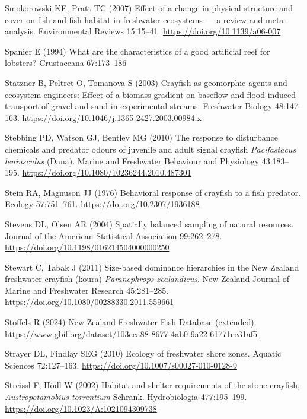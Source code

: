 \documentclass[
  12pt,
  a4paper,
  oneside]{scrbook}
\newlength{\cslhangindent}
\newenvironment{CSLReferences}[2] %
 {\begin{list}{}{%
  \setlength{\itemindent}{0pt}
  \setlength{\leftmargin}{0pt}
  \setlength{\parsep}{0pt}
  \ifodd #1
   \setlength{\leftmargin}{\cslhangindent}
   \setlength{\itemindent}{-1\cslhangindent}
  \fi
  \setlength{\itemsep}{#2\baselineskip}}}
 {\end{list}}
\renewenvironment{CSLReferences}[2]
   {\begin{list}{}{%
    \setlength{\itemindent}{0pt}
    \setlength{\leftmargin}{0pt}
    \setlength{\parsep}{0pt}
    \ifodd #1
     \setlength{\leftmargin}{\cslhangindent}
     \setlength{\itemindent}{-1\cslhangindent}
    \fi
    \setlength{\itemsep}{0.3\baselineskip}}}
   {\end{list}}%
\begin{document}
\begin{CSLReferences}{1}{1}
Smokorowski KE, Pratt TC (2007) Effect of a change in physical structure
and cover on fish and fish habitat in freshwater ecosystems --- a review
and meta-analysis. Environmental Reviews 15:15--41.
\url{https://doi.org/10.1139/a06-007}

Spanier E (1994) What are the characteristics of a good artificial reef
for lobsters? Crustaceana 67:173--186

Statzner B, Peltret O, Tomanova S (2003) Crayfish as geomorphic agents
and ecosystem engineers: Effect of a biomass gradient on baseflow and
flood-induced transport of gravel and sand in experimental streams.
Freshwater Biology 48:147--163.
\url{https://doi.org/10.1046/j.1365-2427.2003.00984.x}

Stebbing PD, Watson GJ, Bentley MG (2010) The response to disturbance
chemicals and predator odours of juvenile and adult signal crayfish
{\emph{Pacifastacus leniusculus}} ({Dana}). Marine and Freshwater
Behaviour and Physiology 43:183--195.
\url{https://doi.org/10.1080/10236244.2010.487301}

Stein RA, Magnuson JJ (1976) Behavioral response of crayfish to a fish
predator. Ecology 57:751--761. \url{https://doi.org/10.2307/1936188}

Stevens DL, Olsen AR (2004) Spatially balanced sampling of natural
resources. Journal of the American Statistical Association 99:262--278.
\url{https://doi.org/10.1198/016214504000000250}

Stewart C, Tabak J (2011) Size‐based dominance hierarchies in the {New
Zealand} freshwater crayfish (koura) {\emph{Paranephrops zealandicus}}.
New Zealand Journal of Marine and Freshwater Research 45:281--285.
\url{https://doi.org/10.1080/00288330.2011.559661}

Stoffels R (2024) {New Zealand Freshwater Fish Database} (extended).
\url{https://www.gbif.org/dataset/103cca88-8677-4ab0-9a22-61771ee31af5}

Strayer DL, Findlay SEG (2010) Ecology of freshwater shore zones.
Aquatic Sciences 72:127--163.
\url{https://doi.org/10.1007/s00027-010-0128-9}

Streissl F, Hödl W (2002) Habitat and shelter requirements of the stone
crayfish, {\emph{Austropotamobius torrentium}} {Schrank}. Hydrobiologia
477:195--199. \url{https://doi.org/10.1023/A:1021094309738}


\end{CSLReferences}
\end{document}
